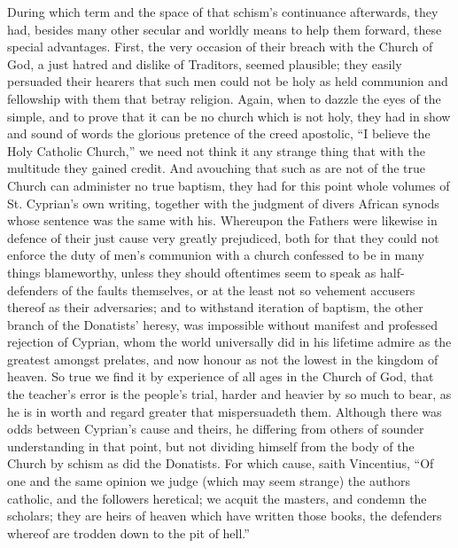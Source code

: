 During which term and the space of that schism’s continuance afterwards, they had, besides many other secular and worldly means to help them forward, these special advantages. First, the very occasion of their breach with the Church of God, a just hatred and dislike of Traditors, seemed plausible; they easily persuaded their hearers that such men could not be holy as held communion and fellowship with them that betray religion. Again, when to dazzle the eyes of the simple, and to prove that it can be no church which is not holy, they had in show and sound of words the glorious pretence of the creed apostolic, “I believe the Holy Catholic Church,” we need not think it any strange thing that with the multitude they gained credit. And avouching that such as are not of the true Church can administer no true baptism, they had for this point whole volumes of St.  Cyprian’s own writing, together with the judgment of divers African synods whose sentence was the same with his. Whereupon the Fathers were likewise in defence of their just cause very greatly prejudiced, both for that they could not enforce the duty of men’s communion with a church confessed to be in many things blameworthy, unless they should oftentimes seem to speak as half-defenders of the faults themselves, or at the least not so vehement accusers thereof as their adversaries; and to withstand iteration of baptism, the other branch of the Donatists’ heresy, was impossible without manifest and professed rejection of Cyprian, whom the world universally did in his lifetime admire as the greatest amongst prelates, and now honour as not the lowest in the kingdom of heaven. So true we find it by experience of all ages in the Church of God, that the teacher’s error is the people’s trial, harder and heavier by so much to bear, as he is in worth and regard greater that mispersuadeth them. Although there was odds between Cyprian’s cause and theirs, he differing from others of sounder understanding in that point, but not dividing himself from the body of the Church by schism as did the Donatists. For which cause, saith Vincentius, “Of one and the same opinion we judge (which may seem strange) the authors catholic, and the followers heretical; we acquit the masters, and condemn the scholars; they are heirs of heaven which have written those books, the defenders whereof are trodden down to the pit of hell.”
